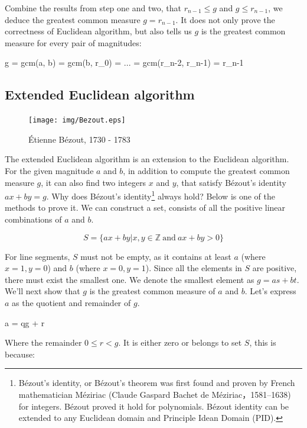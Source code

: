\documentclass{article}
\begin{document}
Combine the results from step one and two, that $r_{n-1} \leq g$ and $g \leq r_{n-1}$, we deduce the greatest common measure $g = r_{n-1}$. It does not only prove the correctness of Euclidean algorithm, but also tells us $g$ is the greatest common measure for every pair of magnitudes:

\be
g = gcm(a, b) = gcm(b, r_0) = ... = gcm(r_{n-2}, r_{n-1}) = r_{n-1}
\label{eq:recursive-gcm}
\ee

\subsection{Extended Euclidean algorithm}

\begin{figure}
 \centering
 \texttt{[image: img/Bezout.eps]}
 \captionsetup{labelformat=empty}
 \caption{Étienne Bézout, 1730 - 1783}
 \label{fig:Bezout}
\end{figure}

The extended Euclidean algorithm is an extension to the Euclidean algorithm. For the given magnitude $a$ and $b$, in addition to compute the greatest common measure $g$, it can also find two integers $x$ and $y$, that satisfy Bézout's identity $ax + by = g$. Why does Bézout's identity\footnote{Bézout's identity, or Bézout's theorem was first found and proven by French mathematician Méziriac (Claude Gaspard Bachet de Méziriac，1581–1638) for integers. Bézout proved it hold for polynomials. Bézout identity can be extended to any Euclidean domain and Principle Idean Domain (PID).} always hold? Below is one of the methods to prove it. We can construct a set, consists of all the positive linear combinations of $a$ and $b$.

\[
S = \{ ax + by | x, y \in \mathbb{Z}\ \text{and} \ ax + by > 0\}
\]

For line segments, $S$ must not be empty, as it contains at least $a$ (where $x = 1, y = 0$) and $b$ (where $x = 0, y = 1$). Since all the elements in $S$ are positive, there must exist the smallest one. We denote the smallest element as $g = as + bt$. We'll next show that $g$ is the greatest common measure of $a$ and $b$. Let's express $a$ as the quotient and remainder of $g$.

\be
a = qg + r
\label{eq:Euclidean-division}
\ee

Where the remainder $0 \leq r < g$. It is either zero or belongs to set $S$, this is because:
\end{document}
